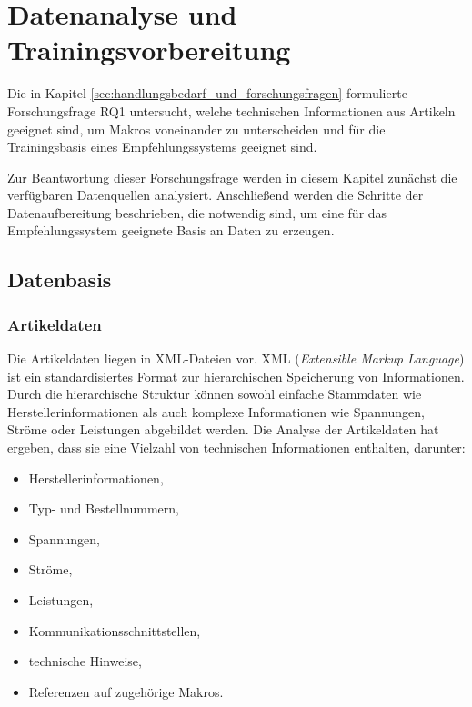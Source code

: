 \chapter{Datenanalyse und Trainingsvorbereitung} 
\label{chap:datenanalyse_und_trainingsvorbereitung} 

Die in Kapitel \ref{sec:handlungsbedarf_und_forschungsfragen} formulierte Forschungsfrage RQ1 untersucht, welche technischen Informationen aus Artikeln geeignet sind, 
um Makros voneinander zu unterscheiden und für die Trainingsbasis eines Empfehlungssystems geeignet sind. 

Zur Beantwortung dieser Forschungsfrage werden in diesem Kapitel zunächst die verfügbaren Datenquellen analysiert. 
Anschließend werden die Schritte der Datenaufbereitung beschrieben, die notwendig sind, um eine für das Empfehlungssystem geeignete Basis an Daten zu erzeugen. 

\section{Datenbasis} 

\subsection{Artikeldaten}
\label{sec:artikeldaten} 

Die Artikeldaten liegen in XML-Dateien vor. 
XML (\textit{Extensible Markup Language}) ist ein standardisiertes Format zur hierarchischen Speicherung von Informationen. 
Durch die hierarchische Struktur können sowohl einfache Stammdaten wie Herstellerinformationen als auch komplexe Informationen wie Spannungen, Ströme oder Leistungen abgebildet werden. 
Die Analyse der Artikeldaten hat ergeben, dass sie eine Vielzahl von technischen Informationen enthalten, darunter: 

\begin{itemize} 
    \item Herstellerinformationen, 
    \item Typ- und Bestellnummern, 
    \item Spannungen, 
    \item Ströme, 
    \item Leistungen,  
    \item Kommunikationsschnittstellen, 
    \item technische Hinweise, 
    \item Referenzen auf zugehörige Makros. 
\end{itemize} 

